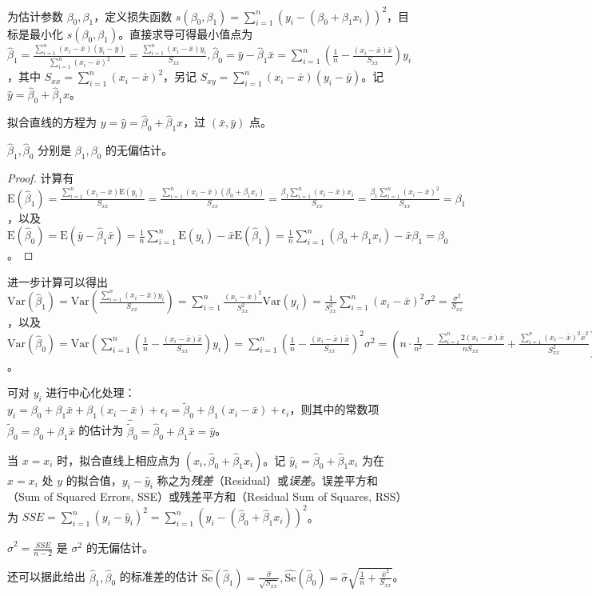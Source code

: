 \documentclass[../main.tex]{subfiles}
\begin{document}
为估计参数 $\beta_0,\beta_1$，定义损失函数 $s(\beta_0,\beta_1)=\sum_{i=1}^n(y_i-(\beta_0+\beta_1x_i))^2$，目标是最小化 $s(\beta_0,\beta_1)$。直接求导可得最小值点为 $\hat\beta_1=\frac{\sum_{i=1}^n(x_i-\bar x)(y_i-\bar y)}{\sum_{i=1}^n(x_i-\bar x)^2}=\frac{\sum_{i=1}^n(x_i-\bar x)y_i}{S_{xx}},\hat\beta_0=\bar y-\hat\beta_1\bar x=\sum_{i=1}^n(\frac1n-\frac{(x_i-\bar x)\bar x}{S_{xx}})y_i$，其中 $S_{xx}=\sum_{i=1}^n(x_i-\bar x)^2$，另记 $S_{xy}=\sum_{i=1}^n(x_i-\bar x)(y_i-\bar y)$。记 $\hat y=\hat\beta_0+\hat\beta_1x$。

拟合直线的方程为 $y=\hat y=\hat\beta_0+\hat\beta_1x$，过 $(\bar x,\bar y)$ 点。

\begin{proposition}
    $\hat\beta_1,\hat\beta_0$ 分别是 $\beta_1,\beta_0$ 的无偏估计。
\end{proposition}

\begin{proof}
    计算有 $\mathrm E(\hat\beta_1)=\frac{\sum_{i=1}^n(x_i-\bar x)\mathrm E(y_i)}{S_{xx}}=\frac{\sum_{i=1}^n(x_i-\bar x)(\beta_0+\beta_1x_i)}{S_{xx}}=\frac{\beta_1\sum_{i=1}^n(x_i-\bar x)x_i}{S_{xx}}=\frac{\beta_1\sum_{i=1}^n(x_i-\bar x)^2}{S_{xx}}=\beta_1$，以及 $\mathrm E(\hat\beta_0)=\mathrm E(\bar y-\hat\beta_1\bar x)=\frac1n\sum_{i=1}^n\mathrm E(y_i)-\bar x\mathrm E(\hat\beta_1)=\frac1n\sum_{i=1}^n(\beta_0+\beta_1x_i)-\bar x\beta_1=\beta_0$。
\end{proof}

进一步计算可以得出 $\mathrm{Var}(\hat\beta_1)=\mathrm{Var}\left(\frac{\sum_{i=1}^n(x_i-\bar x)y_i}{S_{xx}}\right)=\sum_{i=1}^n\frac{(x_i-\bar x)^2}{S_{xx}^2}\mathrm{Var}(y_i)=\frac1{S_{xx}^2}\sum_{i=1}^n(x_i-\bar x)^2\sigma^2=\frac{\sigma^2}{S_{xx}}$，以及 $\mathrm{Var}(\hat\beta_0)=\mathrm{Var}(\sum_{i=1}^n(\frac1n-\frac{(x_i-\bar x)\bar x}{S_{xx}})y_i)=\sum_{i=1}^n(\frac1n-\frac{(x_i-\bar x)\bar x}{S_{xx}})^2\sigma^2=(n\cdot\frac1{n^2}-\frac{\sum_{i=1}^n2(x_i-\bar x)\bar x}{nS_{xx}}+\frac{\sum_{i=1}^n(x_i-\bar x)^2\bar x^2}{S_{xx}^2})\sigma^2=(\frac1n+\frac{\bar x^2}{S_{xx}})\sigma^2=\frac{\sigma^2}{S_{xx}}\frac{\sum_{i=1}^nx_i^2}{n}$。

可对 $y_i$ 进行中心化处理：$y_i=\beta_0+\beta_1\bar x+\beta_1(x_i-\bar x)+\epsilon_i=\tilde\beta_0+\beta_1(x_i-\bar x)+\epsilon_i$，则其中的常数项 $\tilde\beta_0=\beta_0+\beta_1\bar x$ 的估计为 $\hat{\tilde\beta}_0=\hat\beta_0+\hat\beta_1\bar x=\bar y$。

当 $x=x_i$ 时，拟合直线上相应点为 $(x_i,\hat\beta_0+\hat\beta_1x_i)$。记 $\hat y_i=\hat\beta_0+\hat\beta_1x_i$ 为在 $x=x_i$ 处 $y$ 的拟合值，$y_i-\hat y_i$ 称之为\emph{残差}（Residual）或\emph{误差}。误差平方和（Sum of Squared Errors, SSE）或残差平方和（Residual Sum of Squares, RSS）为 $SSE=\sum_{i=1}^n(y_i-\hat y_i)^2=\sum_{i=1}^n(y_i-(\hat\beta_0+\hat\beta_1x_i))^2$。

\begin{proposition}
    $\hat\sigma^2=\frac{SSE}{n-2}$ 是 $\sigma^2$ 的无偏估计。
\end{proposition}

还可以据此给出 $\hat\beta_1,\hat\beta_0$ 的标准差的估计 $\widehat{\mathrm{Se}}(\hat\beta_1)=\frac{\hat\sigma}{\sqrt{S_{xx}}},\widehat{\mathrm{Se}}(\hat\beta_0)=\hat\sigma\sqrt{\frac1n+\frac{\bar x^2}{S_{xx}}}$。
\end{document}
